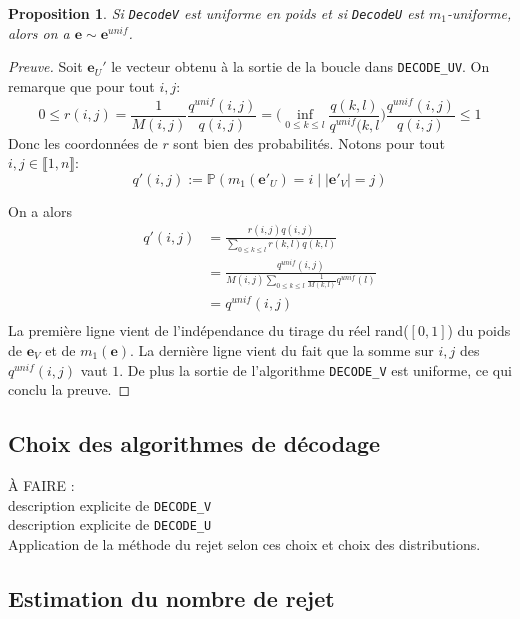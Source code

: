 \documentclass[12pt]{article}
\theoremstyle{plain}
\newtheorem{propo}[thm]{Proposition}
\newcommand{\e}{\mathbf{e}}
\begin{document}
\begin{propo}
Si \verb|DecodeV| est uniforme en poids et si \verb|DecodeU| est $m_1$-uniforme, alors on a $\mathbf{e}\sim\mathbf{e}^{unif}$.
\end{propo}

\begin{proof}[Preuve]
Soit $\e_U'$ le vecteur obtenu à la sortie de la boucle dans \verb|DECODE_UV|. On remarque que pour tout $i,j$:
$$0 \leq r(i,j) = \frac{1}{M(i,j)}\frac{q^{unif}(i,j)}{q(i,j)} = \Bigg(\inf_{0 \leq k \leq l}\frac{q(k,l)}{q^{unif}(k,l}\Bigg)\frac{q^{unif}(i,j)}{q(i,j)} \leq 1$$
Donc les coordonnées de $r$ sont bien des probabilités. Notons pour tout $i,j \in \llbracket 1,n \rrbracket$:
$$q'(i,j) := \mathbb{P}(m_1(\mathbf{e'}_U)=i\;|\;|\mathbf{e'}_V|=j)$$

On a alors 
\begin{equation}
\begin{aligned}
q'(i,j) &= \frac{r(i,j)q(i,j)}{\sum_{0 \leq k \leq l}r(k,l)q(k,l)} \\
 &= \frac{q^{unif}(i,j)}{M(i,j)\sum_{0 \leq k \leq l}\frac{1}{M(k,l)}q^{unif}(l)} \\
 &= q^{unif}(i,j) \\
\end{aligned}
\end{equation}
La première ligne vient de l'indépendance du tirage du réel rand($[0,1]$) du poids de $\e_V$ et de $m_1(\e)$. La dernière ligne vient du fait que la somme sur $i,j$ des $q^{unif}(i,j)$ vaut $1$. De plus la sortie de l'algorithme \verb|DECODE_V| est uniforme, ce qui conclu la preuve.
\end{proof}

\subsection{Choix des algorithmes de décodage}
À FAIRE :\\
description explicite de \verb|DECODE_V| \\
description explicite de \verb|DECODE_U| \\
Application de la méthode du rejet selon ces choix et choix des distributions. 

\subsection{Estimation du nombre de rejet}
\end{document}
